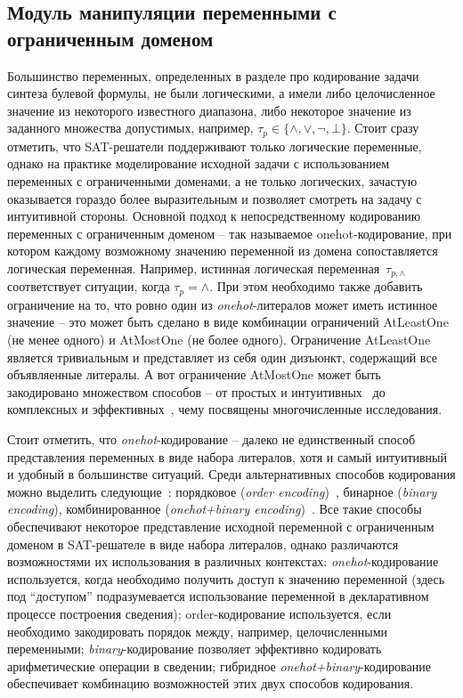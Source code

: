 \subsection{Модуль манипуляции переменными с ограниченным доменом}

Большинство переменных, определенных в разделе про кодирование задачи синтеза булевой формулы, не были логическими, а имели либо целочисленное значение из некоторого известного диапазона, либо некоторое значение из заданного множества допустимых, например, $\tau_{p} \in \{ \land, \lor, \neg, \bot \}$.
Стоит сразу отметить, что SAT-решатели поддерживают только логические переменные, однако на практике моделирование исходной задачи с использованием переменных с ограниченными доменами, а не только логических, зачастую оказывается гораздо более выразительным и позволяет смотреть на задачу с интуитивной стороны.
Основной подход к непосредственному кодированию переменных с ограниченным доменом \--- так называемое onehot-кодирование, при котором каждому возможному значению переменной из домена сопоставляется логическая переменная.
Например, истинная логическая переменная~$\tau_{p, \land}$ соответствует ситуации, когда $\tau_{p} = \land$.
При этом необходимо также добавить ограничение на то, что ровно один из \textit{onehot}-литералов может иметь истинное значение \--- это может быть сделано в виде комбинации ограничений AtLeastOne (не менее одного) и AtMostOne (не более одного).
Ограничение AtLeastOne является тривиальным и представляет из себя один дизъюнкт, содержащий все объявляенные литералы. А вот ограничение AtMostOne может быть закодировано множеством способов \--- от простых и интуитивных~\cite{walsh2000} до комплексных и эффективных~\cite{nguyen2015}, чему посвящены многочисленные исследования.

Стоит отметить, что \textit{onehot}-кодирование \--- далеко не единственный способ представления переменных в виде набора литералов, хотя и самый интуитивный и удобный в большинстве ситуаций. Среди альтернативных способов кодирования можно выделить следующие~\cite{sat-encodings}: порядковое (\textit{order encoding})~\cite{order-encoding}, бинарное (\textit{binary encoding}), комбинированное (\textit{onehot+binary encoding})~\cite{sat-encodings}.
Все такие способы обеспечивают некоторое представление исходной переменной с ограниченным доменом в SAT-решателе в виде набора литералов, однако различаются возможностями их использования в различных контекстах: \textit{onehot}-кодирование используется, когда необходимо получить доступ к значению переменной (здесь под \enquote{доступом} подразумевается использование переменной в декларативном процессе построения сведения); order-кодирование используется, если необходимо закодировать порядок между, например, целочисленными переменными; \textit{binary}-кодирование позволяет эффективно кодировать арифметические операции в сведении; гибридное \textit{onehot+binary}-кодирование обеспечивает комбинацию возможностей этих двух способов кодирования.


